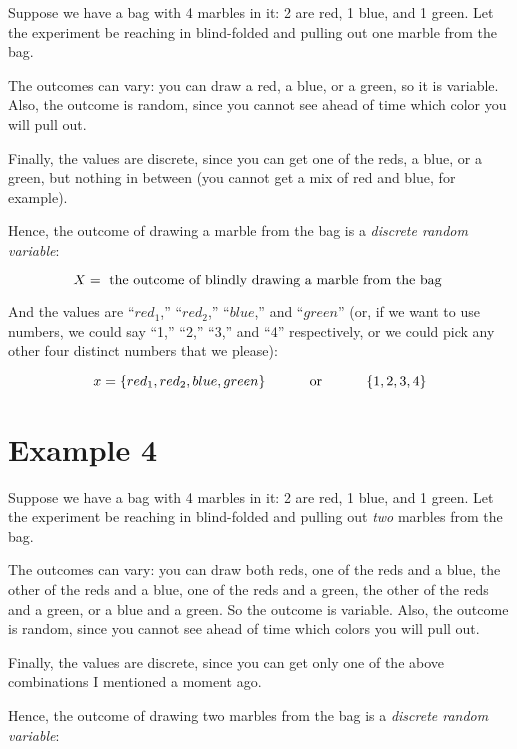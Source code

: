 \documentclass[../../../main.tex]{subfiles}
\begin{document}
Suppose we have a bag with 4 marbles in it: 2 are red, 1 blue, and 1 green. Let the experiment be reaching in blind-folded and pulling out one marble from the bag.

The outcomes can vary: you can draw a red, a blue, or a green, so it is variable. Also, the outcome is random, since you cannot see ahead of time which color you will pull out.

Finally, the values are discrete, since you can get one of the reds, a blue, or a green, but nothing in between (you cannot get a mix of red and blue, for example).

Hence, the outcome of drawing a marble from the bag is a \emph{discrete random variable}:

\begin{equation*}
    \RandVar/ = \text{ the outcome of blindly drawing a marble from the bag }
\end{equation*}

\noindent
And the values are ``$red_{1}$,'' ``$red_{2}$,'' ``$blue$,'' and ``$green$'' (or, if we want to use numbers, we could say ``1,'' ``2,'' ``3,'' and ``4'' respectively, or we could pick any other four distinct numbers that we please):

\begin{equation*}
    \RandVarVal/ = \{ red_{1}, red_{2}, blue, green \} \hskip 1cm \text{ or } \hskip 1cm \{ 1, 2, 3, 4 \}
\end{equation*}


\section{Example 4}

Suppose we have a bag with 4 marbles in it: 2 are red, 1 blue, and 1 green. Let the experiment be reaching in blind-folded and pulling out \emph{two} marbles from the bag.

The outcomes can vary: you can draw both reds, one of the reds and a blue, the other of the reds and a blue, one of the reds and a green, the other of the reds and a green, or a blue and a green. So the outcome is variable. Also, the outcome is random, since you cannot see ahead of time which colors you will pull out.

Finally, the values are discrete, since you can get only one of the above combinations I mentioned a moment ago. 

Hence, the outcome of drawing two marbles from the bag is a \emph{discrete random variable}:
\end{document}
